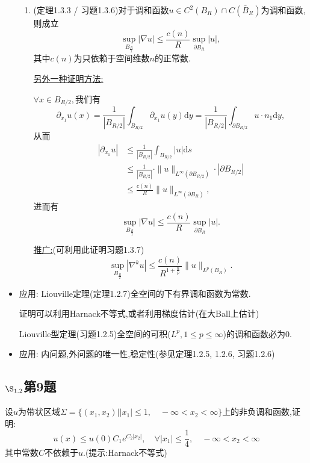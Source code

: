 \documentclass[12pt, a4paper]{ctexbook}
\newcommand{\dy}{\text{d}y}
\newcommand{\ds}{\text{d}s}
\begin{document}
\begin{itemize}
\begin{enumerate}
            \item (定理1.3.3 / 习题1.3.6)对于调和函数$u \in C^2(B_R) \cap C(\bar{B}_R)$为调和函数,则成立$$
            \sup_{B_{\frac{R}{2}}} |\nabla u| \le \frac{c(n)}{R} \sup_{\partial B_R}|u|, $$
            其中$c(n)$为只依赖于空间维数$n$的正常数.
            
            \uline{另外一种证明方法:}
            
            $\forall x\in B_{R/2},$我们有
            $$ \partial_{x_1}u(x) = \frac1{|B_{R/2}|}\int_{B_{R/2}}\partial_{x_1}u(y)\dy = \frac1{|B_{R/2}|}\int_{\partial B_{R/2}} u \cdot n_1\dy ,$$
            从而
            \begin{align*}
            |\partial_{x_1}u| &\leq \frac1{|B_{R/2}|}\int_{B_{R/2}}|u|\ds \\
            &\leq \frac1{|B_{R/2}|} \cdot \|u\|_{L^\infty(\partial B_{R/2})}\cdot |\partial B_{R/2}|\\
            &\leq \frac{c(n)}{R} \|u\|_{L^\infty(\partial B_{R})},
            \end{align*}
            进而有$$
            \sup_{B_{\frac{R}{2}}} |\nabla u| \le \frac{c(n)}{R} \sup_{\partial B_R}|u|.$$
            
            \uline{推广:}(可利用此证明习题1.3.7)
            $$
            \sup_{B_{\frac{R}{2}}} |\nabla^k u| \le \frac{c(n)}{R^{1+\frac np}} \|u\|_{L^p(B_R)}.$$
            
            
        \end{enumerate}
        \item 应用: Liouville定理(定理1.2.7)全空间的下有界调和函数为常数.
        
        证明可以利用Harnack不等式,或者利用梯度估计(在大Ball上估计)
        
        \noindent Liouville型定理(习题1.2.5)全空间的可积($L^p, 1\leq p\leq\infty$)的调和函数必为0.
        
        \item 应用: 内问题,外问题的唯一性,稳定性(参见定理1.2.5, 1.2.6, 习题1.2.6)
        
    \end{itemize}
    
    
    
    
    \subsection{$\S_{1.2}$第9题}
    \kaishu{}
    设$u$为带状区域$\Sigma=\{(x_1,x_2)||x_1|\le 1, \quad -\infty<x_2< \infty\}$上的非负调和函数,证明:$$
    u(x)\le u(0)C_1e^{C_2|x_2|},\quad \forall |x_1|\le \frac{1}{4},\quad -\infty<x_2< \infty     $$
    其中常数$C$不依赖于$u$.(提示:Harnack不等式)\\
    
\end{document}

